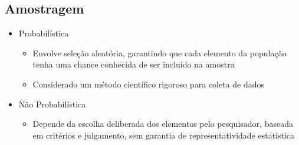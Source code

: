 \documentclass[12pt]{article}
\begin{document}
    \subsection{Amostragem}
    \begin{itemize}
        \item Probabilística
        \begin{itemize}
            \item Envolve seleção aleatória, garantindo que cada elemento da 
            população tenha uma chance conhecida de ser incluído na amostra
            \item Considerado um método científico rigoroso para coleta de dados
        \end{itemize}
        \item Não Probabilística
        \begin{itemize}
            \item Depende da escolha deliberada dos elementos pelo pesquisador, 
            baseada em critérios e julgamento, sem garantia de representatividade 
            estatística
        \end{itemize}
    \end{itemize}
\end{document}
